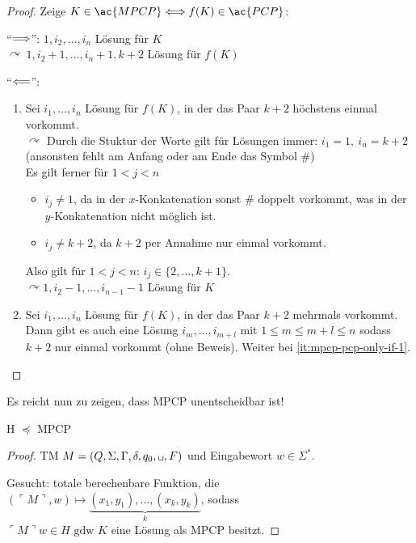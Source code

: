{\begin{proof}
	Zeige $K \in \ac{MPCP} \<==> f(K) \in \ac{PCP}$:
	
	"`$\==>$"': $1, i_2, \dots, i_n$ Lösung für $K$\\
	$\curvearrowright\ 1, i_{2}+1, \dots, i_{n}+1, k+2$ Lösung für $f(K)$
	
	"`$\<==$"':
  \begin{enumerate}
  \item \label{it:mpcp-pcp-only-if-1} Sei $i_1, \dots, i_n$ Lösung für $f(K)$, in der das Paar $k+2$ höchstens einmal vorkommt.\\
  $\curvearrowright$  Durch die Stuktur der Worte gilt für Lösungen immer: $ i_1=1,\ i_n=k+2 $ (ansonsten fehlt am Anfang oder am Ende das Symbol $\#$)\\
  Es gilt ferner für $1 < j < n$
  \begin{itemize}
  \item $i_j \neq 1$, da in der $x$-Konkatenation sonst $\#$ doppelt vorkommt, was in der $y$-Konkatenation nicht möglich ist.
  \item $i_j \neq k+2$, da $k+2$ per Annahme nur einmal vorkommt.
  \end{itemize}
  Also gilt für $1 < j < n$: $i_j \in \{2, \dots, k+1\}$.\\
	$\curvearrowright 1, i_{2}-1, \dots, i_{n-1}-1$ Lösung für $K$
\item Sei $i_1, \dots, i_n$ Lösung für $f(K)$, in der das Paar $k+2$ mehrmals vorkommt.
  Dann gibt es auch eine Lösung $i_m,\dots,i_{m+l}$ mit $1 \le m \le m+l \le n$ sodass $k+2$ nur einmal vorkommt (ohne Beweis).
  Weiter bei \ref{it:mpcp-pcp-only-if-1}.
  \end{enumerate}

\end{proof}
Es reicht nun zu zeigen, dass \ac{MPCP} unentscheidbar ist!

\begin{lemma}[name={[H $\preceq$ \ac{MPCP}]}] 
	H $\preceq$ \ac{MPCP}
\end{lemma}
\begin{proof}
	\ac{TM} $M=(Q,\Sigma,\Gamma,\delta,q_0,\blank,F)$ und Eingabewort $w\in\Sigma^*$.
	
	Gesucht: totale berechenbare Funktion, die $(\ulcorner M \urcorner, w) \mapsto \underbrace{(x_1,y_1),\dots,(x_k,y_k)}_k$, sodass\\
	$\ulcorner M \urcorner w\in H \text{ gdw } K$ eine Lösung als \ac{MPCP} besitzt.
	

\end{proof}}
